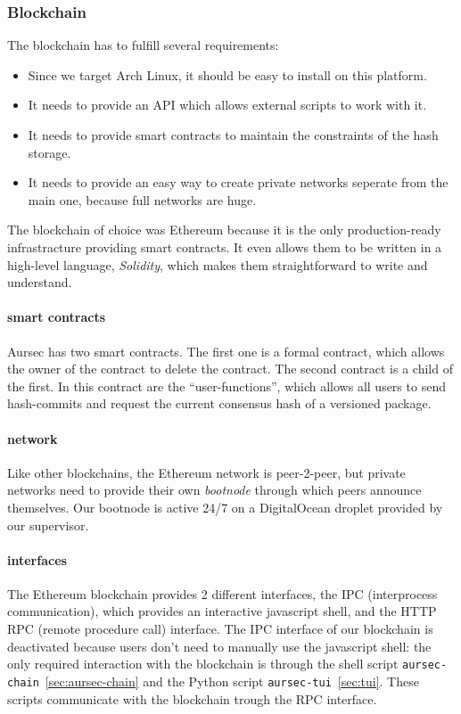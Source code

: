 \subsubsection{Blockchain} \label{sec:blockchain}
The blockchain has to fulfill several requirements: %
\begin{itemize}
	\item Since we target Arch Linux, it should be easy to install on this platform.
	\item It needs to provide an API which allows external scripts to work with it.
	\item It needs to provide smart contracts to maintain the constraints of the hash storage.
	\item It needs to provide an easy way to create private networks seperate from the main one, because full networks are huge.
\end{itemize}

The blockchain of choice was Ethereum because it is the only production-ready infrastracture providing smart contracts. It even allows them to be written in a high-level language, \emph{Solidity}, which makes them straightforward to write and understand.

\paragraph*{smart contracts} %
Aursec has two smart contracts. The first one is a formal contract, which allows the owner of the contract to delete the contract. The second contract is a child of the first. In this contract are the ``user-functions'', which allows all users to send hash-commits and request the current consensus hash of a versioned package. 

\paragraph*{network}
Like other blockchains, the Ethereum network is peer-2-peer, but private networks need to provide their own \emph{bootnode} through which peers announce themselves. Our bootnode is active 24/7 on a DigitalOcean droplet provided by our supervisor.

\paragraph*{interfaces}
The Ethereum blockchain provides 2 different interfaces, the IPC (interprocess communication), which provides an interactive javascript shell, and the HTTP RPC (remote procedure call) interface. The IPC interface of our blockchain is deactivated because users don't need to manually use the javascript shell: the only required interaction with the blockchain is through the shell script \texttt{aursec-chain}~\ref{sec:aursec-chain} and the Python script \texttt{aursec-tui}~\ref{sec:tui}. These scripts communicate with the blockchain trough the RPC interface.